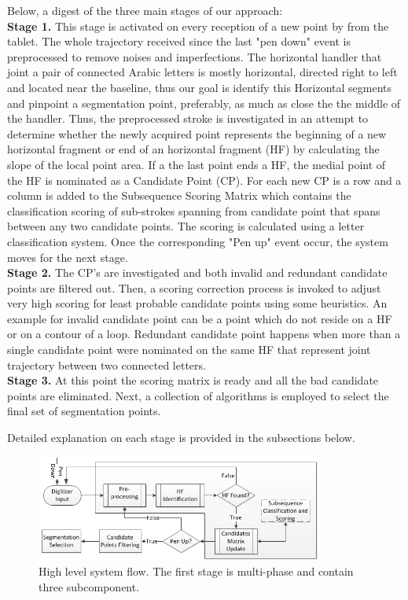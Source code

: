 \documentclass[journal,compsoc]{IEEEtran}
\begin{document}
Below, a digest of the three main stages of our approach: \\

\textbf{Stage 1.} This stage is activated on every reception of a new point by from the tablet. The whole trajectory received since the last "pen down" event is preprocessed to remove noises and imperfections. The horizontal handler that joint a pair of connected Arabic letters is mostly horizontal, directed right to left and located near the baseline, thus our goal is identify this Horizontal segments and pinpoint a segmentation point, preferably, as much as close the the middle of the handler. Thus, the preprocessed stroke is investigated in an attempt to determine whether the newly acquired point represents the beginning of a new horizontal fragment or end of an horizontal fragment (HF) by calculating the slope of the local point area. If a the last point ends a HF, the medial point of the HF is nominated as a Candidate Point (CP). For each new CP is a row and a column is added to the Subsequence Scoring Matrix which contains the classification scoring of sub-strokes spanning from candidate point that spans between any two candidate points. The scoring is calculated using a letter classification system. Once the corresponding "Pen up" event occur, the system moves for the next stage.\\ 

\textbf{Stage 2.} The CP's are investigated and both invalid and redundant candidate points are filtered out. Then, a scoring correction process is invoked to adjust very high scoring for least probable candidate points using some heuristics. An example for invalid candidate point can be a point which do not reside on a HF or on a contour of a loop. Redundant candidate point happens when more than a single candidate point were nominated on the same HF  that represent joint trajectory between two connected letters.\\

\textbf{Stage 3.} At this point the scoring matrix is ready and all the bad candidate points are eliminated. Next, a collection of algorithms is employed to select the final set of segmentation points.

Detailed explanation on each stage is provided in the subsections below.

\begin{figure}
\centering
\includegraphics[width=9.5cm]{./figures/system_flow}
\caption{High level system flow. The first stage is multi-phase and contain three subcomponent. }
\label{fig:system_flow}
\end{figure}
\end{document}

